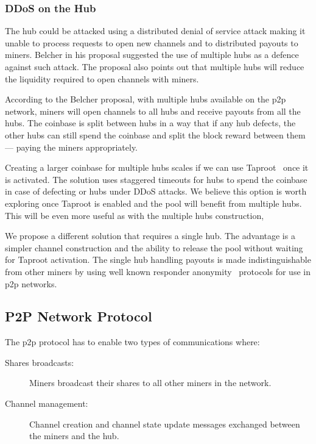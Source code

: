 \documentclass{article}
\begin{document}
\subsubsection{DDoS on the Hub}\label{ref:ddos-attack}

The hub could be attacked using a distributed denial of service attack
making it unable to process requests to open new channels and to
distributed payouts to miners. Belcher in his proposal suggested the
use of multiple hubs as a defence against such attack. The proposal
also points out that multiple hubs will reduce the liquidity required
to open channels with miners.

According to the Belcher proposal, with multiple hubs available on the
p2p network, miners will open channels to all hubs and receive payouts
from all the hubs. The coinbase is split between hubs in a way that if
any hub defects, the other hubs can still spend the coinbase and split
the block reward between them --- paying the miners appropriately.

Creating a larger coinbase for multiple hubs scales if we can use
Taproot~\cite{bip340,bip341, bip342} once it is activated. The
solution uses staggered timeouts for hubs to spend the coinbase in
case of defecting or hubs under DDoS attacks. We believe this option
is worth exploring once Taproot is enabled and the pool will benefit
from multiple hubs. This will be even more useful as with the multiple
hubs construction, 

We propose a different solution that requires a single hub. The
advantage is a simpler channel construction and the ability to release
the pool without waiting for Taproot activation. The single hub
handling payouts is made indistinguishable from other miners by using
well known responder anonymity~\cite{responder-anonymity:file-sharing,
  liu2010rumor, responder-anonymity:p2p, gap-gnunet} protocols for use
in p2p networks.

\subsection{P2P Network Protocol}\label{sec:p2p-protocol}

The p2p protocol has to enable two types of communications where:

\begin{description}
\item[Shares broadcasts:] Miners broadcast their shares to all other
  miners in the network.
\item[Channel management:] Channel creation and channel state update
  messages exchanged between the miners and the hub.
\end{description}
\end{document}
